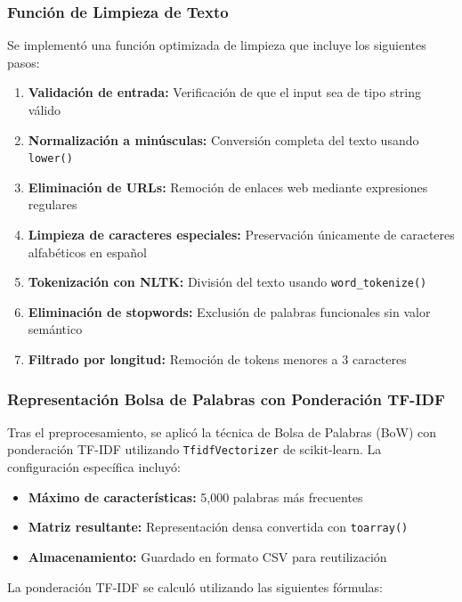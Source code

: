 \subsubsection{Función de Limpieza de Texto}

Se implementó una función optimizada de limpieza que incluye los siguientes pasos:

\begin{enumerate}
    \item \textbf{Validación de entrada:} Verificación de que el input sea de tipo string válido
    \item \textbf{Normalización a minúsculas:} Conversión completa del texto usando \texttt{lower()}
    \item \textbf{Eliminación de URLs:} Remoción de enlaces web mediante expresiones regulares
    \item \textbf{Limpieza de caracteres especiales:} Preservación únicamente de caracteres alfabéticos en español
    \item \textbf{Tokenización con NLTK:} División del texto usando \texttt{word\_tokenize()}
    \item \textbf{Eliminación de stopwords:} Exclusión de palabras funcionales sin valor semántico
    \item \textbf{Filtrado por longitud:} Remoción de tokens menores a 3 caracteres
\end{enumerate}

\subsubsection{Representación Bolsa de Palabras con Ponderación TF-IDF}

Tras el preprocesamiento, se aplicó la técnica de Bolsa de Palabras (BoW) con ponderación TF-IDF utilizando \texttt{TfidfVectorizer} de scikit-learn. La configuración específica incluyó:

\begin{itemize}
    \item \textbf{Máximo de características:} 5,000 palabras más frecuentes
    \item \textbf{Matriz resultante:} Representación densa convertida con \texttt{toarray()}
    \item \textbf{Almacenamiento:} Guardado en formato CSV para reutilización
\end{itemize}

La ponderación TF-IDF se calculó utilizando las siguientes fórmulas:

